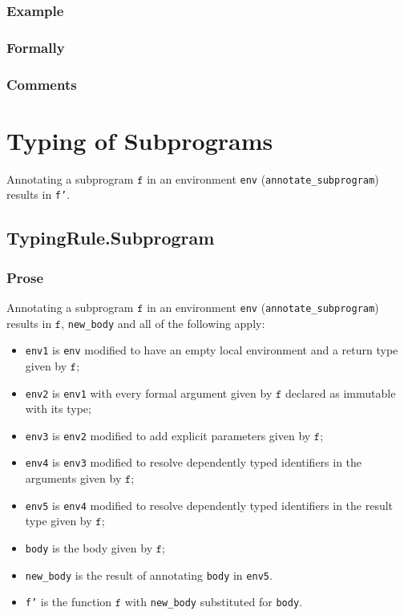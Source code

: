 \documentclass{book}
\newcommand\vf[0]{\texttt{f}}
\begin{document}
\begin{itemize}
  \subsection{Example}



  \subsection{Formally}

  \subsection{Comments}

\chapter{Typing of Subprograms}

Annotating a subprogram $\vf$ in an environment \texttt{env}
(\texttt{annotate\_subprogram}) results in \texttt{f'}.

\section{TypingRule.Subprogram \label{sec:TypingRule.Subprogram}}

  \subsection{Prose}
Annotating a subprogram $\vf$ in an environment \texttt{env}
(\texttt{annotate\_subprogram}) results in $\vf$, \texttt{new\_body} and all of
the following apply:
 \begin{itemize}
   \item \texttt{env1} is \texttt{env} modified to have an empty local
     environment and a return type given by $\vf$;
   \item \texttt{env2} is \texttt{env1} with every formal argument given by
     $\vf$ declared as immutable with its type;
   \item \texttt{env3} is \texttt{env2} modified to add explicit parameters
     given by $\vf$;
   \item \texttt{env4} is \texttt{env3} modified to resolve dependently typed
     identifiers in the arguments given by $\vf$;
   \item \texttt{env5} is \texttt{env4} modified to resolve dependently typed
     identifiers in the result type given by $\vf$;
   \item \texttt{body} is the body given by $\vf$;
   \item \texttt{new\_body} is the result of annotating \texttt{body} in
     \texttt{env5}.
   \item \texttt{f'} is the function $\vf$ with \texttt{new\_body} substituted for \texttt{body}.
 \end{itemize}
 \end{itemize}
\end{document}
